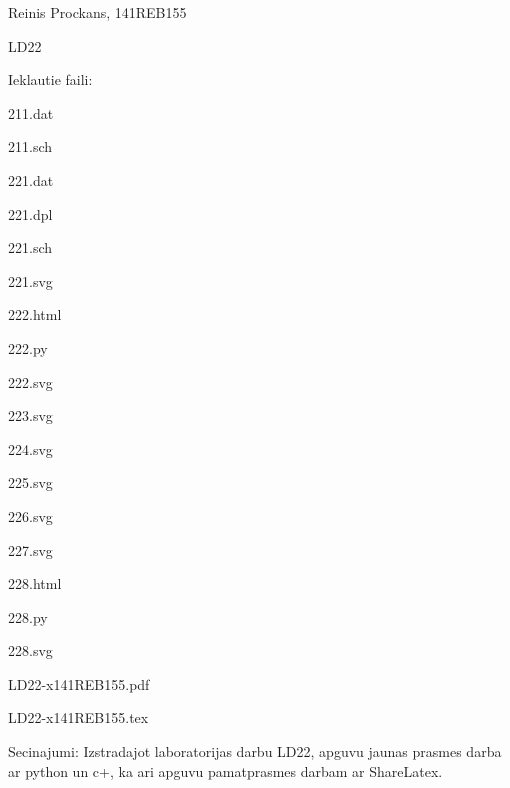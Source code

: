 \documentclass{article}
\begin{document}
\begin{flushright}
Reinis Prockans, 141REB155
\end{flushright}

\begin{center}
{\huge LD22}
\end{center}

\begin{flushleft}
Ieklautie faili:

211.dat

211.sch

221.dat

221.dpl

221.sch

221.svg

222.html

222.py

222.svg

223.svg

224.svg

225.svg

226.svg

227.svg

228.html

228.py

228.svg

LD22-x141REB155.pdf

LD22-x141REB155.tex
\end{flushleft}

\begin{flushleft}
Secinajumi: Izstradajot laboratorijas darbu LD22, apguvu jaunas prasmes darba ar python un c+, ka ari apguvu pamatprasmes darbam ar ShareLatex.
\end{flushleft}
\end{document}
